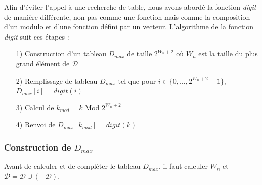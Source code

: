 \documentclass[12pt, a4paper]{memoir}
\begin{document}
Afin d'éviter l'appel à une recherche de table, nous avons abordé la fonction \emph{digit} de manière différente,
non pas comme une fonction mais comme la composition d'un modulo et d'une fonction défini par un vecteur.
L'algorithme de la fonction \emph{digit} suit ces étapes :
\begin{itemize}
 \item [1)] Construction d'un tableau \emph{$D_{max}$} de taille $2^{W_n+2}$ où $W_n$ est la taille du plus grand élément de $\mathcal{D}$
 \item [2)] Remplissage de tableau \emph{$D_{max}$} tel que pour $i \in \{0,\ldots,2^{W_n+2}-1\}$, $D_{max}[i] = digit(i)$
 \item [3)] Calcul de $k_{mod} = k$ Mod $2^{W_n+2}$
 \item [4)] Renvoi de $D_{max}[k_{mod}] = digit(k)$
\end{itemize}

\subsubsection{Construction de \emph{$D_{max}$}}

Avant de calculer et de compléter le tableau \emph{$D_{max}$}, il faut calculer $W_n$ et $\overline{\mathcal{D}} = \mathcal{D} \cup (-\mathcal{D})$.
\end{document}
